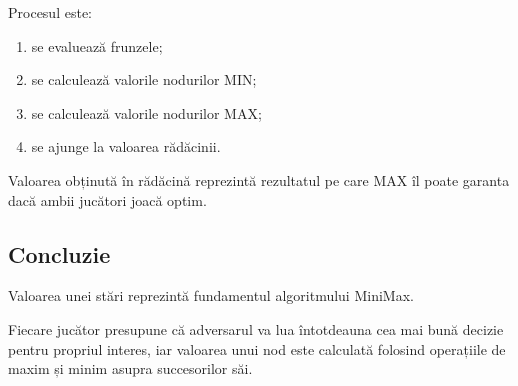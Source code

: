 \documentclass[12pt,a4paper]{article}
\begin{document}
Procesul este:

\begin{enumerate}
\item se evaluează frunzele;
\item se calculează valorile nodurilor MIN;
\item se calculează valorile nodurilor MAX;
\item se ajunge la valoarea rădăcinii.
\end{enumerate}

Valoarea obținută în rădăcină reprezintă rezultatul pe care MAX îl poate garanta dacă ambii jucători joacă optim.

\subsection{Concluzie}

Valoarea unei stări reprezintă fundamentul algoritmului MiniMax.

Fiecare jucător presupune că adversarul va lua întotdeauna cea mai bună decizie pentru propriul interes, iar valoarea unui nod este calculată folosind operațiile de maxim și minim asupra succesorilor săi.






\enddocument{}
\end{document}
